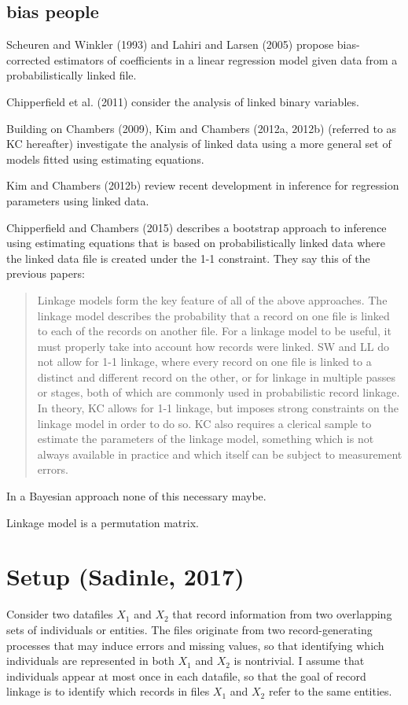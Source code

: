 \documentclass[11pt,reqno]{amsart}
\begin{document}
\subsection{bias people}
Scheuren and Winkler (1993) and Lahiri and Larsen (2005) propose bias-corrected estimators of coefficients in a linear regression model given data from a probabilistically linked file. 

Chipperfield et al. (2011) consider the analysis of linked binary variables.

Building on Chambers (2009), Kim and Chambers (2012a, 2012b) (referred to as KC hereafter) investigate the analysis of linked data using a more general set of models fitted using estimating equations.

Kim and Chambers (2012b) review recent development in inference for regression parameters
using linked data.

Chipperfield and Chambers (2015) describes a bootstrap approach to inference using estimating equations that is based on probabilistically linked data where the linked data file is created under the 1-1 constraint.  They say this of the previous papers: 

\begin{quote}
Linkage models form the key feature of all of the above approaches. The linkage model
describes the probability that a record on one file is linked to each of the records on another
file. For a linkage model to be useful, it must properly take into account how records were
linked. SW and LL do not allow for 1-1 linkage, where every record on one file is linked to
a distinct and different record on the other, or for linkage in multiple passes or stages,
both of which are commonly used in probabilistic record linkage. In theory, KC allows
for 1-1 linkage, but imposes strong constraints on the linkage model in order to do so.
KC also requires a clerical sample to estimate the parameters of the linkage model,
something which is not always available in practice and which itself can be subject to
measurement errors.
\end{quote}

In a Bayesian approach none of this necessary maybe. 

Linkage model is a permutation matrix. 
\section{Setup (Sadinle, 2017)}
Consider two datafiles $X_1$ and $X_2$ that record information from two overlapping sets of individuals or entities.  The files originate from two record-generating processes that may induce errors and missing values, so that identifying which individuals are represented in both $X_1$ and $X_2$ is nontrivial.  I assume that individuals appear at most once in each datafile, so that the goal of record linkage is to identify which records in files $X_1$ and $X_2$ refer to the same entities.  
\end{document}
